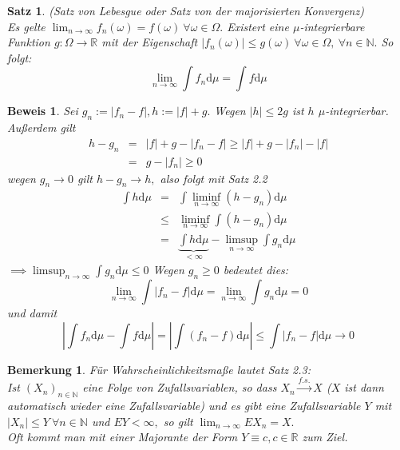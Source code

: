 \documentclass[a4paper,11pt]{book}
\newcommand{\R}{{\mathbb R}}
\newcommand{\N}{{\mathbb N}}
\def\folgt{\ensuremath{\implies}}
\def\d{\mbox{d}}
\def\fs{\stackrel{f.s.}{\rightarrow }}
\newtheorem{Sa}{Satz}[chapter]
\newtheorem{Bem}{Bemerkung}[chapter]
\theoremstyle{nonumberplain}
\newtheorem{Bew}{Beweis}
\begin{document}
\begin{Sa} (Satz von Lebesgue oder Satz von der majorisierten Konvergenz)\\
Es gelte $\lim_{n\to\infty} f_n(\omega)=f(\omega)\ \forall\omega\in\Omega.$ Existert eine $\mu$-integrierbare Funktion $g:\Omega\to\R$ mit der Eigenschaft $|f_n(\omega)|\le g(\omega)\ \forall\omega\in\Omega, \ \forall n\in\N.$ So folgt:
$$\lim_{n\to\infty}\int f_n\d\mu = \int f\d\mu$$
\end{Sa}
\begin{Bew} Sei $g_n:=|f_n - f|, h:=|f|+g.$ Wegen $|h|\le 2g$ ist $h$ $\mu$-integrierbar. Außerdem gilt
\begin{eqnarray*}
h-g_n &=& |f| + g - |f_n - f| \ge |f|+g-|f_n|-|f|\\
&=& g-|f_n|\ge 0
\end{eqnarray*}
wegen $g_n\to 0$ gilt $h-g_n\to h,$ also folgt mit Satz 2.2
\begin{eqnarray*}
\int h\d\mu &=&\int \liminf_{n\to\infty}(h-g_n)\d\mu\\
&\le&\liminf_{n\to\infty}\int(h-g_n)\d\mu\\
&=&\underbrace{\int h\d\mu}_{<\infty} - \limsup_{n\to\infty}\int g_n\d\mu
\end{eqnarray*}
$\folgt \limsup_{n\to\infty}\int g_n\d\mu\le 0$ Wegen $g_n\ge 0$ bedeutet dies:
$$\lim_{n\to\infty}\int|f_n - f|\d\mu = \lim_{n\to\infty}\int g_n\d\mu = 0$$
und damit
$$|\int f_n\d\mu - \int f\d\mu| = |\int(f_n-f)\d\mu| \le \int|f_n-f|\d\mu\to 0$$
\end{Bew}

\begin{Bem} Für Wahrscheinlichkeitsmaße lautet Satz 2.3:\\
Ist $(X_n)_{n\in\N}$ eine Folge von Zufallsvariablen, so dass $X_n\fs X$ ($X$ ist dann automatisch wieder eine Zufallsvariable) und es gibt eine Zufallsvariable $Y$ mit $|X_n|\le Y\ \forall n\in\N$ und $EY<\infty,$ so gilt $\lim_{n\to\infty} EX_n = X.$\\
Oft kommt man mit einer Majorante der Form $Y\equiv c, c\in\R$ zum Ziel.
\end{Bem}
\end{document}
